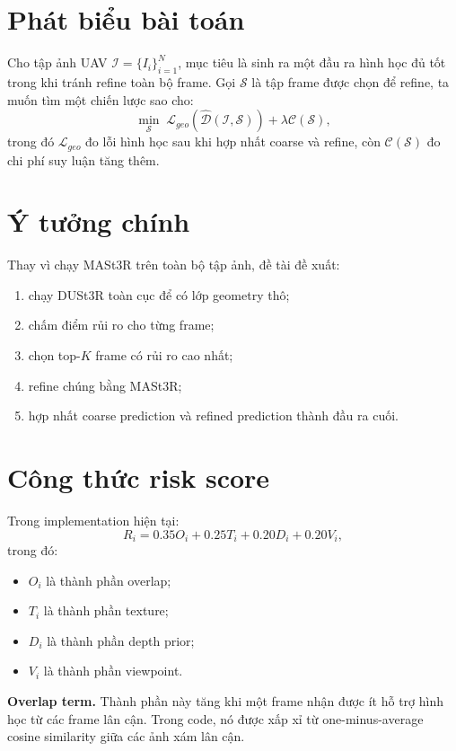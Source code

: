 \documentclass[../DoAn.tex]{subfiles}
\begin{document}
\section{Phát biểu bài toán}

Cho tập ảnh UAV $\mathcal{I}=\{I_i\}_{i=1}^{N}$, mục tiêu là sinh ra một đầu ra hình học đủ tốt trong khi tránh refine toàn bộ frame. Gọi $\mathcal{S}$ là tập frame được chọn để refine, ta muốn tìm một chiến lược sao cho:
\[
\min_{\mathcal{S}} \; \mathcal{L}_{geo}(\hat{\mathcal{D}}(\mathcal{I}, \mathcal{S})) + \lambda \mathcal{C}(\mathcal{S}),
\]
trong đó $\mathcal{L}_{geo}$ đo lỗi hình học sau khi hợp nhất coarse và refine, còn $\mathcal{C}(\mathcal{S})$ đo chi phí suy luận tăng thêm.

\section{Ý tưởng chính}

Thay vì chạy MASt3R trên toàn bộ tập ảnh, đề tài đề xuất:
\begin{enumerate}[leftmargin=1.5em]
  \item chạy DUSt3R toàn cục để có lớp geometry thô;
  \item chấm điểm rủi ro cho từng frame;
  \item chọn top-$K$ frame có rủi ro cao nhất;
  \item refine chúng bằng MASt3R;
  \item hợp nhất coarse prediction và refined prediction thành đầu ra cuối.
\end{enumerate}

\section{Công thức risk score}

Trong implementation hiện tại:
\[
R_i = 0.35 O_i + 0.25 T_i + 0.20 D_i + 0.20 V_i,
\]
trong đó:
\begin{itemize}[leftmargin=1.5em]
  \item $O_i$ là thành phần overlap;
  \item $T_i$ là thành phần texture;
  \item $D_i$ là thành phần depth prior;
  \item $V_i$ là thành phần viewpoint.
\end{itemize}

\textbf{Overlap term.} Thành phần này tăng khi một frame nhận được ít hỗ trợ hình học từ các frame lân cận. Trong code, nó được xấp xỉ từ one-minus-average cosine similarity giữa các ảnh xám lân cận.
\end{document}
